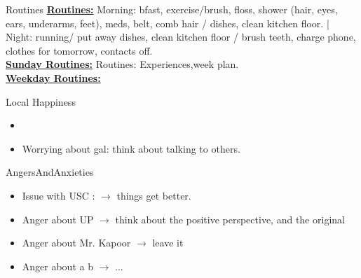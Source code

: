 \begin{multicols}{4}
\begin{columns}
  \begin{column}{0.20\linewidth}
    \begin{block}{Routines}
      { \tiny \underline{\bf Routines:} Morning: bfast, exercise/brush,
        floss, shower (hair, eyes, ears, underarms, feet), meds, belt,
        comb hair / dishes, clean kitchen floor. |  Night: running/ put
        away dishes, clean kitchen floor / brush teeth, charge phone,
        clothes for tomorrow, contacts off.}\\
      {\tiny \underline{\bf Sunday Routines:} Routines:
        Experiences,week plan.}\\ 
      {\tiny \underline{\bf Weekday Routines:}}\\
    \end{block} 
    \begin{block}{Local Happiness}
      \begin{itemize} 
        \tiny \item \tiny
      \item \tiny Worrying about gal: think about talking to others.
      \end{itemize} 
    \end{block}
    \begin{block}{AngersAndAnxieties}
      \begin{itemize}
        \item \tiny Issue with USC : $\rightarrow$ things get better. 
        \tiny \item \tiny Anger about UP $\rightarrow$ think about the positive
        perspective, and the original
      \item \tiny Anger about Mr. Kapoor $\rightarrow$  leave it
      \item \tiny Anger about a b  $\rightarrow$ ...


\end{itemize}
\end{block}
\end{column}
\end{columns}
\end{multicols}
